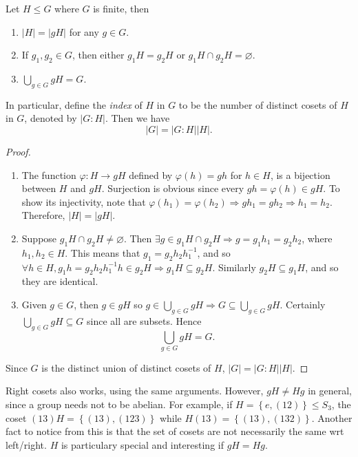 \documentclass[10pt]{article}
\def\le{\leqslant}
\begin{document}
    \begin{theorem}[Lagrange]\label{thm:Lagrange}
        Let $ H \le G $ where $G$ is finite, then 
        \begin{enumerate}
            \item $ |H|=|gH| $ for any $ g\in G $.
            \item If $ g_1,g_2\in G $, then either $ g_1H=g_2H $ or $ g_1H \cap g_2 H=\varnothing  $.
            \item $ \displaystyle \bigcup_{g\in G}gH=G $.
        \end{enumerate}
        In particular, define the \textit{index} of $H$ in $G$ to be the number of distinct cosets of $H$ in $G$, denoted by $ |G:H| $. Then we have 
        \[
            |G|=|G:H||H|
        .\]
    \end{theorem}
    \begin{proof}
        \begin{enumerate}
            \item The function $ \varphi:H\to gH $ defined by $ \varphi(h)=gh $ for $h\in H$, is a bijection between $H$ and $gH$. Surjection is obvious since every $ gh=\varphi(h)\in gH $. To show its injectivity, note that $\varphi(h_1)=\varphi(h_2)\Rightarrow gh_1=gh_2 \Rightarrow h_1=h_2 $. Therefore, $ |H|=|gH|$.
            \item Suppose $ g_1H\cap g_2H\neq \varnothing $. Then $ \exists g\in g_1H\cap g_2H \Rightarrow g=g_1h_1=g_2h_2 $, where $h_1,h_2\in H$. This means that $ g_1=g_2h_2h_1^{-1} $, and so $ \forall h\in H, g_1h=g_2h_2h_1^{-1}h\in g_2H \Rightarrow g_1H \subseteq g_2H $. Similarly $ g_2H \subseteq g_1H $, and so they are identical.
            \item Given $g\in G$, then $ g\in gH $ so $ g\in \bigcup_{g\in G}gH \Rightarrow G \subseteq \bigcup_{g\in G}gH $. Certainly $ \bigcup_{g\in G}gH \subseteq G $ since all are subsets. Hence 
            \[
                \bigcup_{g\in G}gH=G
            .\]
        \end{enumerate}
        Since $G$ is the distinct union of distinct cosets of $H$, $|G|=|G:H||H|$.
    \end{proof}
    \begin{remark}
        Right cosets also works, using the same arguments. However, $ gH\neq Hg $ in general, since a group needs not to be abelian. For example, if $ H=\left\{ e,(12)\right\}\le S_3 $, the coset $ (13)H=\left\{ (13),(123)\right\} $ while $ H(13)=\left\{ (13),(132)\right\} $. Another fact to notice from this is that the set of cosets are not necessarily the same wrt left/right. $H$ is particulary special and interesting if $ gH=Hg $.
    \end{remark}
\end{document}
